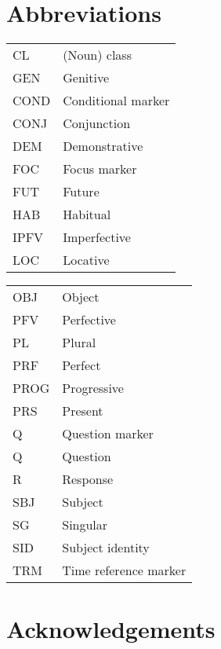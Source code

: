 \documentclass[output=paper,colorlinks,citecolor=brown]{langscibook}
\begin{document}
\section*{Abbreviations}
\begin{tabularx}{.45\textwidth}{lQ}
CL & (Noun) class\\
GEN & Genitive\\
COND & Conditional marker\\
CONJ & Conjunction\\
DEM & Demonstrative\\
FOC & Focus marker\\
FUT & Future\\
HAB & Habitual\\
IPFV & Imperfective\\
LOC & Locative\\
\end{tabularx}
\begin{tabularx}{.45\textwidth}{lQ}
OBJ & Object\\
PFV & Perfective\\
PL & Plural\\
PRF & Perfect\\
PROG & Progressive\\
PRS & Present\\
Q & Question marker\\
Q & Question\\
R & Response\\
SBJ & Subject\\
SG & Singular\\
SID & Subject identity\\
TRM & Time reference marker\\
\end{tabularx}

\section*{Acknowledgements}



\printbibliography[heading=subbibliography,notkeyword=this]
\end{document}
